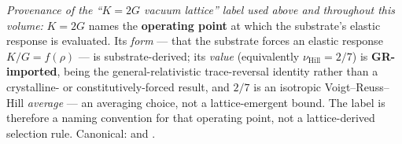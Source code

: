 \noindent\emph{Provenance of the ``$K=2G$ vacuum lattice'' label used above and throughout this volume:} $K=2G$ names the \textbf{operating point} at which the substrate's elastic response is evaluated. Its \emph{form} --- that the substrate forces an elastic response $K/G = f(\rho)$ --- is substrate-derived; its \emph{value} (equivalently $\nu_{\text{Hill}} = 2/7$) is \textbf{GR-imported}, being the general-relativistic trace-reversal identity rather than a crystalline- or constitutively-forced result, and $2/7$ is an isotropic Voigt--Reuss--Hill \emph{average} --- an averaging choice, not a lattice-emergent bound. The label is therefore a naming convention for that operating point, not a lattice-derived selection rule. Canonical:  and .

